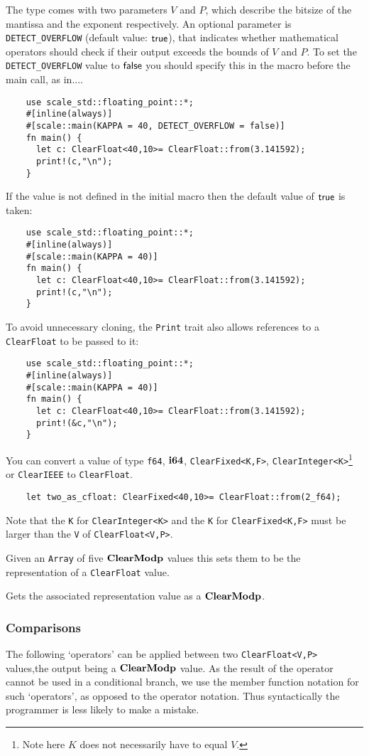 The type comes with two parameters $V$ and $P$, which describe the bitsize of the 
mantissa and the exponent respectively. 
An optional parameter is \verb|DETECT_OVERFLOW| (default value: ${\mathsf{true}}$), that indicates whether 
mathematical operators should check if their output exceeds the bounds of $V$ and $P$.
To set the  \verb|DETECT_OVERFLOW| value to ${\mathsf{false}}$ you should specify this in 
the macro before the main call, as in....
\begin{lstlisting}
    use scale_std::floating_point::*;
    #[inline(always)]
    #[scale::main(KAPPA = 40, DETECT_OVERFLOW = false)]
    fn main() {
      let c: ClearFloat<40,10>= ClearFloat::from(3.141592);
      print!(c,"\n");
    }
\end{lstlisting}
If the value is not defined in the initial macro then the default value of
${\mathsf{true}}$ is taken:
\begin{lstlisting}
    use scale_std::floating_point::*;
    #[inline(always)]
    #[scale::main(KAPPA = 40)]
    fn main() {
      let c: ClearFloat<40,10>= ClearFloat::from(3.141592);
      print!(c,"\n");
    }
\end{lstlisting}
To avoid unnecessary cloning, the \verb|Print| trait also
allows references to a \verb|ClearFloat| to be passed to it:
\begin{lstlisting}
    use scale_std::floating_point::*;
    #[inline(always)]
    #[scale::main(KAPPA = 40)]
    fn main() {
      let c: ClearFloat<40,10>= ClearFloat::from(3.141592);
      print!(&c,"\n");
    }
\end{lstlisting}


You can convert a value of type \verb|f64|, $\mathbf{i64}$, \verb|ClearFixed<K,F>|,
\verb|ClearInteger<K>|\footnote{Note here $K$ does not necessarily have to
equal $V$.} or \verb|ClearIEEE| to \verb|ClearFloat|. 
\begin{lstlisting}
    let two_as_cfloat: ClearFixed<40,10>= ClearFloat::from(2_f64);
\end{lstlisting}
Note that the \verb|K| for \verb|ClearInteger<K>| and the \verb|K| for \verb|ClearFixed<K,F>| 
must be larger than the \verb|V| of \verb|ClearFloat<V,P>|.

Given an \verb|Array| of five $\mathbf{ClearModp}$ values this sets them 
to be the representation of a \verb|ClearFloat| value.

Gets the associated representation value as a $\mathbf{ClearModp}$.

\subsubsection{Comparisons}
The following `operators' can be applied between two \verb|ClearFloat<V,P>|
values,the output being a $\mathbf{ClearModp}$ value.
As the result of the operator cannot be used in a conditional branch,
we use the member function notation for such `operators', as opposed
to the operator notation. Thus syntactically the programmer is less
likely to make a mistake.

